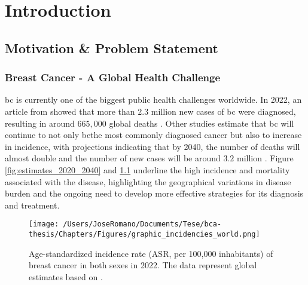 
%

\chapter{Introduction}
\label{cha:introduction}

\section{Motivation \& Problem Statement}
\label{sec:motivation+problem-statement}
\subsection{Breast Cancer - A Global Health Challenge}

\gls{bc} is currently one of the biggest public health challenges worldwide. In
2022, an article from \textcite{bcaData2024_bray} showed that more than $2.3$
million new cases of \gls{bc} were diagnosed, resulting in
around $665,\!000$ global deaths . Other studies
estimate that \gls{bc} will continue to not only bethe most commonly diagnosed
cancer but also to increase in incidence, with projections indicating that by
2040, the number of deaths will almost double and the number of new cases will
be around $3.2$ million \cite{bca_data_Arnold2022Current}. Figure
\ref{fig:estimates_2020_2040} and \ref{fig:graphic_incidencies_world}
underline the high incidence and mortality associated with the disease,
highlighting the geographical variations in disease burden and the ongoing need
to develop more effective strategies for its diagnosis and treatment.

\begin{figure}[h!]
  \centering
  \texttt{[image: /Users/JoseRomano/Documents/Tese/bca-thesis/Chapters/Figures/graphic\_incidencies\_world.png]}
  \caption{Age-standardized incidence rate (ASR, per 100,000 inhabitants) of breast cancer in both sexes in 2022.
    The data represent global estimates based on \textcite{GLOBOCAN2022}.}
  \label{fig:graphic_incidencies_world}
\end{figure}

